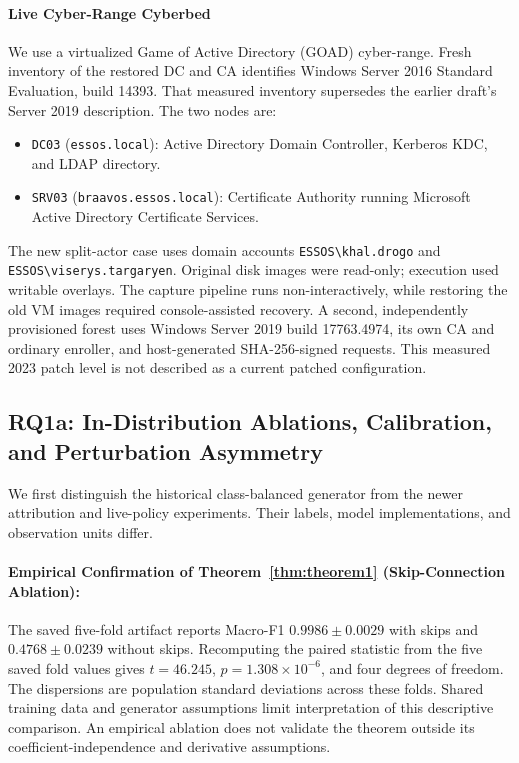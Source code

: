 \paragraph{Live Cyber-Range Cyberbed} We use a virtualized Game of Active Directory (GOAD) cyber-range. Fresh inventory of the restored DC and CA identifies Windows Server 2016 Standard Evaluation, build 14393. That measured inventory supersedes the earlier draft's Server 2019 description. The two nodes are:
\begin{itemize}
    \item \texttt{DC03} (\texttt{essos.local}): Active Directory Domain Controller, Kerberos KDC, and LDAP directory.
    \item \texttt{SRV03} (\texttt{braavos.essos.local}): Certificate Authority running Microsoft Active Directory Certificate Services.
\end{itemize}
The new split-actor case uses domain accounts \texttt{ESSOS\textbackslash khal.drogo} and \texttt{ESSOS\textbackslash viserys.targaryen}. Original disk images were read-only; execution used writable overlays. The capture pipeline runs non-interactively, while restoring the old VM images required console-assisted recovery. A second, independently provisioned forest uses Windows Server 2019 build 17763.4974, its own CA and ordinary enroller, and host-generated SHA-256-signed requests. This measured 2023 patch level is not described as a current patched configuration.

\subsection{RQ1a: In-Distribution Ablations, Calibration, and Perturbation Asymmetry}
We first distinguish the historical class-balanced generator from the newer attribution and live-policy experiments. Their labels, model implementations, and observation units differ.

\paragraph{Empirical Confirmation of Theorem~\ref{thm:theorem1} (Skip-Connection Ablation):}
The saved five-fold artifact reports Macro-F1 $0.9986 \pm 0.0029$ with skips and $0.4768 \pm 0.0239$ without skips. Recomputing the paired statistic from the five saved fold values gives $t=46.245$, $p=1.308\times10^{-6}$, and four degrees of freedom. The dispersions are population standard deviations across these folds. Shared training data and generator assumptions limit interpretation of this descriptive comparison. An empirical ablation does not validate the theorem outside its coefficient-independence and derivative assumptions.

